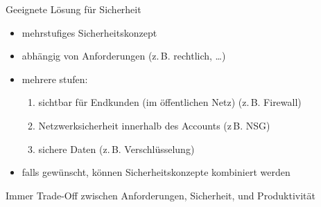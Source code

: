 \begin{flashcard}[\ ]{Geeignete Lösung für Sicherheit}
    \begin{itemize}
        \item mehrstufiges Sicherheitskonzept
        \item abhängig von Anforderungen (z.\,B. rechtlich, \ldots)
        \item mehrere stufen:\newline
        \begin{enumerate}
            \item sichtbar für Endkunden (im öffentlichen Netz) (z.\,B. Firewall)
            \item Netzwerksicherheit innerhalb des Accounts (z\,B. NSG)
            \item sichere Daten (z.\,B. Verschlüsselung)
        \end{enumerate}
        \item falls gewünscht, können Sicherheitskonzepte kombiniert werden
    \end{itemize}
    Immer Trade-Off zwischen Anforderungen, Sicherheit, und Produktivität
\end{flashcard}

